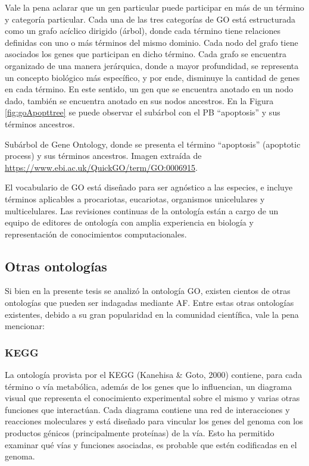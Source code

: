 \documentclass[12pt,twoside]{reedthesis}
\begin{document}
Vale la pena aclarar que un gen particular puede participar en más de un término y categoría particular. Cada una de las tres categorías de GO está estructurada como un grafo acíclico dirigido (árbol), donde cada término tiene relaciones definidas con uno o más términos del mismo dominio. Cada nodo del grafo tiene asociados los genes que participan en dicho término. Cada grafo se encuentra organizado de una manera jerárquica, donde a mayor profundidad, se representa un concepto biológico más específico, y por ende, disminuye la cantidad de genes en cada término. En este sentido, un gen que se encuentra anotado en un nodo dado, también se encuentra anotado en sus nodos ancestros. En la Figura \ref{fig:goApopttree} se puede observar el subárbol con el PB ``apoptosis'' y sus términos ancestros.

Subárbol de Gene Ontology, donde se presenta el término ``apoptosis'' (apoptotic process) y sus términos ancestros. Imagen extraída de \url{https://www.ebi.ac.uk/QuickGO/term/GO:0006915}.



El vocabulario de GO está diseñado para ser agnóstico a las especies, e incluye términos aplicables a procariotas, eucariotas, organismos unicelulares y multicelulares. Las revisiones continuas de la ontología están a cargo de un equipo de editores de ontología con amplia experiencia en biología y representación de conocimientos computacionales.

\hypertarget{otras-ontologuxedas}{%
\subsection{Otras ontologías}\label{otras-ontologuxedas}}

Si bien en la presente tesis se analizó la ontología GO, existen cientos de otras ontologías que pueden ser indagadas mediante AF. Entre estas otras ontologías existentes, debido a su gran popularidad en la comunidad científica, vale la pena mencionar:

\hypertarget{kegg}{%
\subsubsection{KEGG}\label{kegg}}

La ontología provista por el KEGG (Kanehisa \& Goto, 2000) contiene, para cada término o vía metabólica, además de los genes que lo influencian, un diagrama visual que representa el conocimiento experimental sobre el mismo y varias otras funciones que interactúan. Cada diagrama contiene una red de interacciones y reacciones moleculares y está diseñado para vincular los genes del genoma con los productos génicos (principalmente proteínas) de la vía. Esto ha permitido examinar qué vías y funciones asociadas, es probable que estén codificadas en el genoma.
\end{document}
